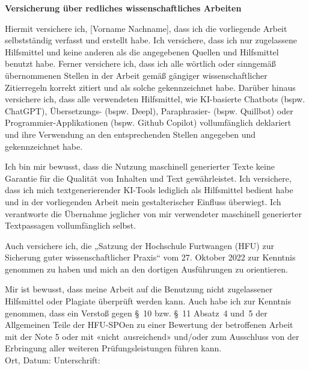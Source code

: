 \label{affidavit}

\textbf{Versicherung über redliches wissenschaftliches Arbeiten}

Hiermit versichere ich, [Vorname Nachname], dass ich die vorliegende
Arbeit selbstständig verfasst und erstellt habe. Ich versichere, dass
ich nur zugelassene Hilfsmittel und keine anderen als die angegebenen
Quellen und Hilfsmittel benutzt habe. Ferner versichere ich, dass ich
alle wörtlich oder sinngemäß übernommenen Stellen in der Arbeit gemäß
gängiger wissenschaftlicher Zitierregeln korrekt zitiert und als solche
gekennzeichnet habe. Darüber hinaus versichere ich, dass alle
verwendeten Hilfsmittel, wie KI-basierte Chatbots (bspw. ChatGPT),
Übersetzungs- (bspw. Deepl), Paraphrasier- (bspw. Quillbot) oder
Programmier-Applikationen (bspw. Github Copilot) vollumfänglich
deklariert und ihre Verwendung an den entsprechenden Stellen angegeben
und gekennzeichnet habe.

Ich bin mir bewusst, dass die Nutzung maschinell generierter Texte keine
Garantie für die Qualität von Inhalten und Text gewährleistet. Ich
versichere, dass ich mich textgenerierender KI-Tools lediglich als
Hilfsmittel bedient habe und in der vorliegenden Arbeit mein
gestalterischer Einfluss überwiegt. Ich verantworte die Übernahme
jeglicher von mir verwendeter maschinell generierter Textpassagen
vollumfänglich selbst.

Auch versichere ich, die „Satzung der Hochschule Furtwangen (HFU) zur
Sicherung guter wissenschaftlicher Praxis`` vom 27. Oktober 2022 zur
Kenntnis genommen zu haben und mich an den dortigen Ausführungen zu
orientieren.

Mir ist bewusst, dass meine Arbeit auf die Benutzung nicht zugelassener
Hilfsmittel oder Plagiate überprüft werden kann. Auch habe ich zur
Kenntnis genommen, dass ein Verstoß gegen §~10 bzw. §~11 Absatz~4 und~5
der Allgemeinen Teile der HFU-SPOen zu einer Bewertung der betroffenen
Arbeit mit der Note 5 oder mit «nicht~ausreichend» und/oder zum
Ausschluss von der Erbringung aller weiteren Prüfungsleistungen führen
kann.
\\[1.5cm]
Ort, Datum:	\hrulefill\enspace Unterschrift: \hrulefill
\\[3.5cm]